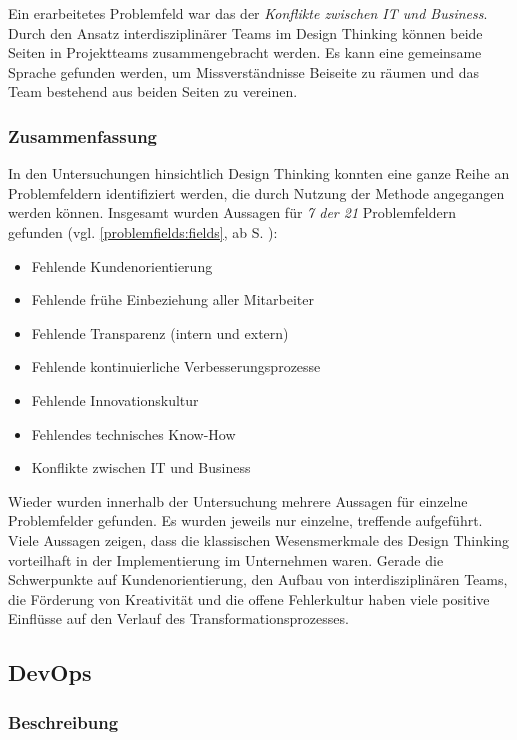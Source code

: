 Ein erarbeitetes Problemfeld war das der \textit{Konflikte zwischen IT und Business}. Durch den Ansatz interdisziplinärer Teams im Design Thinking können beide Seiten in Projektteams zusammengebracht werden. Es kann eine gemeinsame Sprache gefunden werden, um Missverständnisse Beiseite 
zu räumen und das Team bestehend aus beiden Seiten zu vereinen.

\subsubsection{Zusammenfassung}

In den Untersuchungen hinsichtlich Design Thinking konnten eine ganze Reihe an Problemfeldern identifiziert werden, die durch Nutzung der Methode angegangen werden können. Insgesamt wurden Aussagen für \textit{7 der 21} Problemfeldern gefunden (vgl. \ref{problemfields:fields}, ab S. \pageref{problemfields:fields}):

\begin{itemize}[noitemsep, topsep=0pt]
	\item Fehlende Kundenorientierung
	\item Fehlende frühe Einbeziehung aller Mitarbeiter
	\item Fehlende Transparenz (intern und extern)
	\item Fehlende kontinuierliche Verbesserungsprozesse
	\item Fehlende Innovationskultur
	\item Fehlendes technisches Know-How
	\item Konflikte zwischen IT  und Business
\end{itemize}

Wieder wurden innerhalb der Untersuchung mehrere Aussagen für einzelne Problemfelder gefunden. Es wurden jeweils nur einzelne, treffende aufgeführt. Viele Aussagen zeigen, dass die klassischen Wesensmerkmale des Design Thinking vorteilhaft in der Implementierung im Unternehmen waren. Gerade die Schwerpunkte auf Kundenorientierung, den Aufbau von interdisziplinären Teams, die Förderung von Kreativität und die offene Fehlerkultur haben viele positive Einflüsse auf den Verlauf des Transformationsprozesses.
 
\subsection{DevOps}

\subsubsection{Beschreibung}

